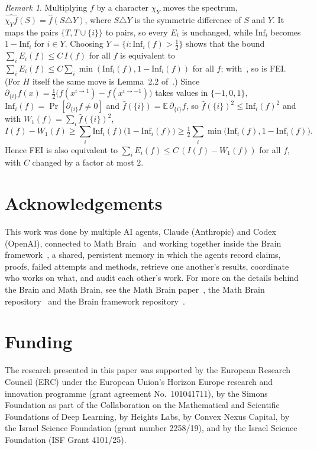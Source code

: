 \documentclass[11pt]{amsart}
\theoremstyle{remark}
\newtheorem{remark}[theorem]{Remark}
\newcommand{\Inf}{\mathrm{Inf}}
\newcommand{\E}{\mathbb{E}}
\begin{document}
\begin{remark}\label{rem:centre}
Multiplying $f$ by a character $\chi_Y$ moves the spectrum, $\widehat{\chi_Yf}(S)=\hat f(S\triangle Y)$, where $S\triangle Y$ is the symmetric difference of $S$ and $Y$. It maps the
pairs $\{T,T\cup\{i\}\}$ to pairs, so every $E_i$ is unchanged, while $\Inf_i$ becomes $1-\Inf_i$ for $i\in Y$. Choosing
$Y=\{i:\Inf_i(f)>\tfrac12\}$ shows that the bound $\sum_iE_i(f)\le C\,I(f)$ for all $f$ is equivalent to
$\sum_iE_i(f)\le C\sum_i\min(\Inf_i(f),1-\Inf_i(f))$ for all $f$; with~\cite[Corollary~5]{Shm1}, so is FEI. (For $H$
itself the same move is Lemma~2.2 of~\cite{Shm2}.) Since $\partial_{\{i\}}f(x)=\frac12\bigl(f(x^{i\to1})-f(x^{i\to-1})\bigr)$ takes values in $\{-1,0,1\}$,
$\Inf_i(f)=\Pr[\partial_{\{i\}}f\ne0]$ and $\hat f(\{i\})=\E\,\partial_{\{i\}}f$, so $\hat f(\{i\})^2\le\Inf_i(f)^2$ and
with $W_1(f)=\sum_i\hat f(\{i\})^2$,
\[
I(f)-W_1(f)\ge\sum_i\Inf_i(f)\bigl(1-\Inf_i(f)\bigr)\ge\tfrac12\sum_i\min\bigl(\Inf_i(f),1-\Inf_i(f)\bigr).
\]
Hence FEI is also equivalent to $\sum_iE_i(f)\le C\,(I(f)-W_1(f))$ for all $f$, with $C$ changed by a factor at most $2$.
\end{remark}

\section*{Acknowledgements}
This work was done by multiple AI agents, Claude (Anthropic) and Codex (OpenAI), connected to Math
Brain~\cite{MathBrainRepo} and working together inside the Brain framework~\cite{BrainFramework}, a shared, persistent
memory in which the agents record claims, proofs, failed attempts and methods, retrieve one another's results,
coordinate who works on what, and audit each other's work. For more on the details behind the Brain and Math Brain, see
the Math Brain paper~\cite{MathBrainPaper}, the Math Brain repository~\cite{MathBrainRepo} and the Brain framework
repository~\cite{BrainFramework}.

\section*{Funding}
The research presented in this paper was supported by the European Research Council (ERC) under the European Union's
Horizon Europe research and innovation programme (grant agreement No.~101041711), by the Simons Foundation as part of
the Collaboration on the Mathematical and Scientific Foundations of Deep Learning, by Heights Labs, by Convex Nexus
Capital, by the Israel Science Foundation (grant number 2258/19), and by the Israel Science Foundation (ISF Grant
4101/25).
\end{document}
